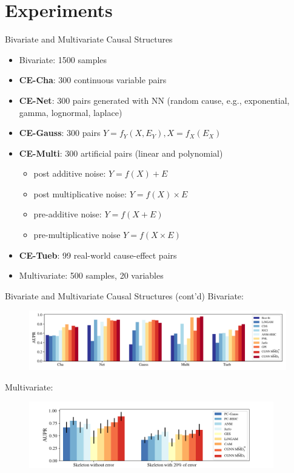 \documentclass{beamer}
\begin{document}
\section{Experiments}
\begin{frame}{Bivariate and Multivariate Causal Structures}
	\begin{itemize}
		\item Bivariate: 1500 samples
		\item \textbf{CE-Cha}: 300 continuous variable pairs
		\item \textbf{CE-Net}: 300 pairs generated with NN (random cause, e.g., exponential, gamma, lognormal, laplace)
		\item \textbf{CE-Gauss}: 300 pairs $Y = f_{Y}(X,E_{Y}), X=f_{X}(E_{X})$
		\item \textbf{CE-Multi}: 300 artificial pairs (linear and polynomial)
		      \begin{itemize}
			      \item post additive noise: $Y=f(X)+E$
			      \item post multiplicative noise: $Y=f(X) \times E$
			      \item pre-additive noise: $Y=f(X+E)$
			      \item pre-multiplicative noise $Y=f(X \times E)$
		      \end{itemize}
		\item \textbf{CE-Tueb}: 99 real-world cause-effect pairs
		\item Multivariate: 500 samples, 20 variables
	\end{itemize}
\end{frame}
\begin{frame}{Bivariate and Multivariate Causal Structures (cont'd)}
	Bivariate:
	\begin{figure}[ht]
		\centering
		\includegraphics[width=1\textwidth,keepaspectratio]{img/aupr_pairwise.pdf}
		\caption*{\label{fig:auc-pairwise} }
	\end{figure}
	\vspace{-1cm}
	Multivariate:
	\begin{figure}[ht]
		\centering
		\includegraphics[width=0.95\textwidth,keepaspectratio]{img/graph_scores_multadd.png}
		\caption*{\label{fig:auc-multivariate} }
	\end{figure}

\end{frame}
\end{document}
